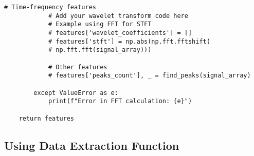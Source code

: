 \begin{lstlisting}[style=pystyle]
            # Time-frequency features
            # Add your wavelet transform code here
            # Example using FFT for STFT
            # features['wavelet_coefficients'] = []
            # features['stft'] = np.abs(np.fft.fftshift(
            # np.fft.fft(signal_array)))

            # Other features
            # features['peaks_count'], _ = find_peaks(signal_array)

        except ValueError as e:
            print(f"Error in FFT calculation: {e}")

    return features
\end{lstlisting}
% 
% 
% 
% 
% 
% 
\subsection{Using Data Extraction Function}
% 
